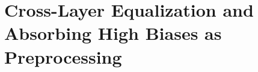 \documentclass{article}
\theoremstyle{plain}
\theoremstyle{definition}
\theoremstyle{remark}
\begin{document}




\section{Cross-Layer Equalization and Absorbing High Biases as Preprocessing}
\end{document}
